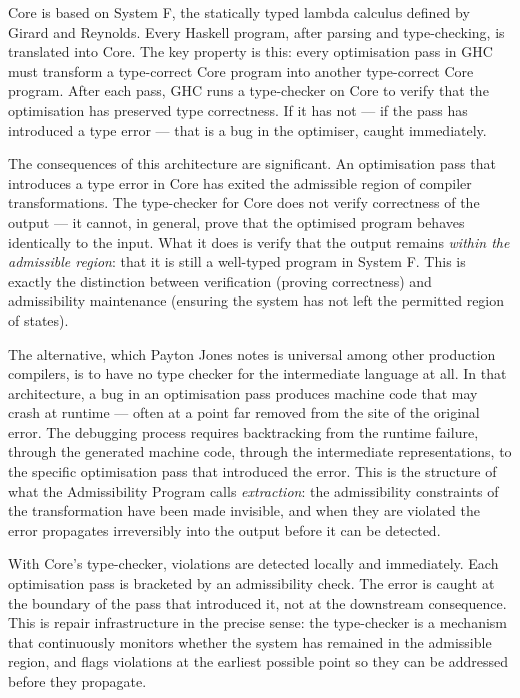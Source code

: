 \documentclass[12pt]{article}
\begin{document}
Core is based on System F, the statically typed lambda calculus defined by
Girard and Reynolds. Every Haskell program, after parsing and type-checking,
is translated into Core. The key property is this: every optimisation pass in
GHC must transform a type-correct Core program into another type-correct Core
program. After each pass, GHC runs a type-checker on Core to verify that the
optimisation has preserved type correctness. If it has not — if the pass has
introduced a type error — that is a bug in the optimiser, caught immediately.

The consequences of this architecture are significant. An optimisation pass that
introduces a type error in Core has exited the admissible region of compiler
transformations. The type-checker for Core does not verify correctness of the
output — it cannot, in general, prove that the optimised program behaves
identically to the input. What it does is verify that the output remains
\emph{within the admissible region}: that it is still a well-typed program in
System F. This is exactly the distinction between verification (proving
correctness) and admissibility maintenance (ensuring the system has not left the
permitted region of states).

The alternative, which Payton Jones notes is universal among other production
compilers, is to have no type checker for the intermediate language at all.
In that architecture, a bug in an optimisation pass produces machine code that
may crash at runtime — often at a point far removed from the site of the
original error. The debugging process requires backtracking from the runtime
failure, through the generated machine code, through the intermediate
representations, to the specific optimisation pass that introduced the error.
This is the structure of what the Admissibility Program calls \emph{extraction}:
the admissibility constraints of the transformation have been made invisible, and
when they are violated the error propagates irreversibly into the output before
it can be detected.

With Core's type-checker, violations are detected locally and immediately. Each
optimisation pass is bracketed by an admissibility check. The error is caught at
the boundary of the pass that introduced it, not at the downstream consequence.
This is repair infrastructure in the precise sense: the type-checker is a
mechanism that continuously monitors whether the system has remained in the
admissible region, and flags violations at the earliest possible point so they
can be addressed before they propagate.
\end{document}
